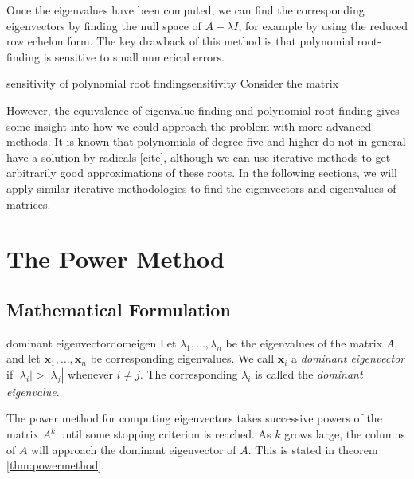 \documentclass{article}
\let\vec\mathbf
\begin{document}
Once the eigenvalues have been computed, we can find the corresponding eigenvectors by finding the null space of $A - \lambda I$, for example by using the reduced row echelon form. The key drawback of this method is that polynomial root-finding is sensitive to small numerical errors.

\begin{example}{sensitivity of polynomial root finding}{sensitivity}
  Consider the matrix
\end{example}

However, the equivalence of eigenvalue-finding and polynomial root-finding gives some insight into how we could approach the problem with more advanced methods. It is known that polynomials of degree five and higher do not in general have a solution by radicals [cite], although we can use iterative methods to get arbitrarily good approximations of these roots. In the following sections, we will apply similar iterative methodologies to find the eigenvectors and eigenvalues of matrices.

\section{The Power Method}
\subsection{Mathematical Formulation}
\begin{definition}{dominant eigenvector}{domeigen}
  Let $\lambda_1, \ldots, \lambda_n$ be the eigenvalues of the matrix $A$, and let $\vec{x}_1, \ldots, \vec{x}_n$ be corresponding eigenvalues. We call $\vec{x}_i$ a \textit{dominant eigenvector} if $|\lambda_i| > |\lambda_j|$ whenever $i \neq j$. The corresponding $\lambda_i$ is called the \textit{dominant eigenvalue}.
\end{definition}

The power method for computing eigenvectors takes successive powers of the matrix $A^k$ until some stopping criterion is reached. As $k$ grows large, the columns of $A$ will approach the dominant eigenvector of $A$. This is stated in theorem \ref{thm:powermethod}.
\end{document}
